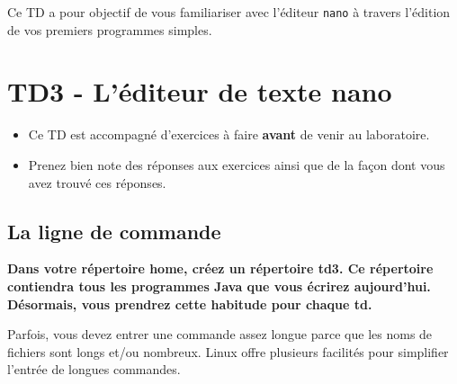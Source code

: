 \documentclass[a4paper,11pt]{article}
\date{2018 -- 2019}
\begin{document}
\entete
\titre
{}
\lastedit


	\begin{tcolorbox}[blanker,
	before skip=10mm,after skip=10mm,
	borderline west={1mm}{-4mm}{lightgray},
	title=Objectifs, coltitle=black, fonttitle=\sffamily\bfseries\large]
	Ce TD a pour objectif de vous familiariser avec l'éditeur \verb_nano_ \`a travers l'\'edition de vos premiers programmes simples.  
	\end{tcolorbox}
	
	\tableofcontents

	\newpage


\section{TD3 - L'éditeur de texte nano}
	 \begin{consigne}
	 	\begin{itemize}
			\item Ce TD est accompagn\'e d'exercices \`a faire \textbf{avant} de venir au laboratoire.
			\item Prenez bien note des r\'eponses aux exercices ainsi que de la fa\c con dont vous avez trouv\'e ces r\'eponses.
		\end{itemize}				
	\end{consigne}
	
	\subsection{La ligne de commande}
	
		\textbf{Dans votre r\'epertoire home, cr\'eez un r\'epertoire td3. Ce r\'epertoire contiendra tous les programmes Java que vous \'ecrirez aujourd'hui. 
		D\'esormais, vous prendrez cette habitude pour chaque td.}
            	
		\par
        
         	 Parfois, vous devez entrer une commande assez longue parce que les noms de fichiers sont longs et/ou nombreux.
          	Linux offre plusieurs facilit\'es pour simplifier l'entr\'ee de longues commandes.  
        
            	\par
        
\end{document}
